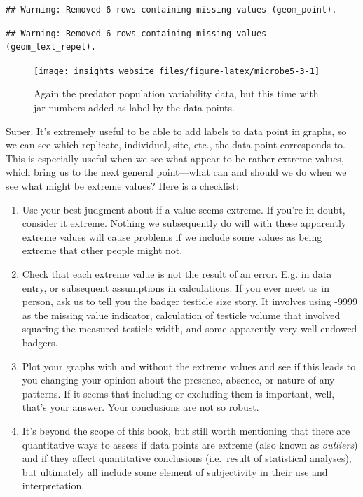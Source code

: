 \documentclass[]{book}
\begin{document}
\begin{verbatim}
## Warning: Removed 6 rows containing missing values (geom_point).
\end{verbatim}

\begin{verbatim}
## Warning: Removed 6 rows containing missing values (geom_text_repel).
\end{verbatim}

\begin{figure}

{\centering \texttt{[image: insights\_website\_files/figure-latex/microbe5-3-1]} 

}

\caption{Again the predator population variability data, but this time with jar numbers added as label by the data points.}\label{fig:microbe5-3}
\end{figure}

Super. It's extremely useful to be able to add labels to data point in graphs, so we can see which replicate, individual, site, etc., the data point corresponds to. This is especially useful when we see what appear to be rather extreme values, which bring us to the next general point---what can and should we do when we see what might be extreme values? Here is a checklist:

\begin{enumerate}
\def\labelenumi{\arabic{enumi}.}
\item
  Use your best judgment about if a value seems extreme. If you're in doubt, consider it extreme. Nothing we subsequently do will with these apparently extreme values will cause problems if we include some values as being extreme that other people might not.
\item
  Check that each extreme value is not the result of an error. E.g. in data entry, or subsequent assumptions in calculations. If you ever meet us in person, ask us to tell you the badger testicle size story. It involves using -9999 as the missing value indicator, calculation of testicle volume that involved squaring the measured testicle width, and some apparently very well endowed badgers.
\item
  Plot your graphs with and without the extreme values and see if this leads to you changing your opinion about the presence, absence, or nature of any patterns. If it seems that including or excluding them is important, well, that's your answer. Your conclusions are not so robust.
\item
  It's beyond the scope of this book, but still worth mentioning that there are quantitative ways to assess if data points are extreme (also known as \emph{outliers}) and if they affect quantitative conclusions (i.e.~result of statistical analyses), but ultimately all include some element of subjectivity in their use and interpretation.
\end{enumerate}
\end{document}
